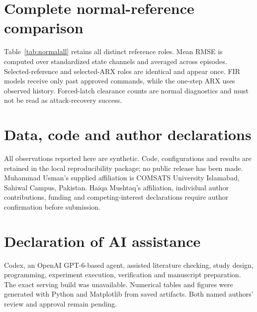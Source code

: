 \documentclass[11pt]{article}
\begin{document}
\section{Complete normal-reference comparison}\label{app:normal}
Table~\ref{tab:normalall} retains all distinct reference roles. Mean RMSE is computed over standardized state channels and averaged across episodes. Selected-reference and selected-ARX roles are identical and appear once. FIR models receive only past approved commands, while the one-step ARX uses observed history. Forced-latch clearance counts are normal diagnostics and must not be read as attack-recovery success.

\begin{table}[!ht]\centering\small
\caption{Study II: all distinct roles on the new normal tasks. Every row uses 29,700 eligible observations and 108 probes.}\label{tab:normalall}
\setlength{\tabcolsep}{4pt}

\end{table}
\clearpage

\section*{Data, code and author declarations}
All observations reported here are synthetic. Code, configurations and results are retained in the local reproducibility package; no public release has been made. Muhammad Usman's supplied affiliation is COMSATS University Islamabad, Sahiwal Campus, Pakistan. Haiqa Mushtaq's affiliation, individual author contributions, funding and competing-interest declarations require author confirmation before submission.

\section*{Declaration of AI assistance}
Codex, an OpenAI GPT-6-based agent, assisted literature checking, study design, programming, experiment execution, verification and manuscript preparation. The exact serving build was unavailable. Numerical tables and figures were generated with Python and Matplotlib from saved artifacts. Both named authors' review and approval remain pending.
\end{document}
